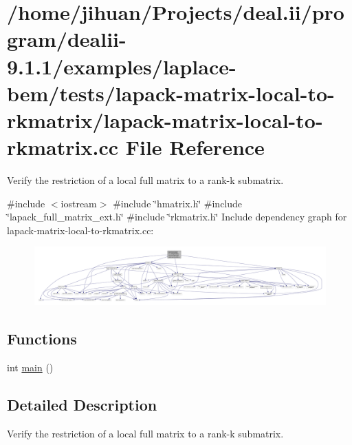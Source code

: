 \hypertarget{lapack-matrix-local-to-rkmatrix_8cc}{}\section{/home/jihuan/\+Projects/deal.ii/program/dealii-\/9.1.1/examples/laplace-\/bem/tests/lapack-\/matrix-\/local-\/to-\/rkmatrix/lapack-\/matrix-\/local-\/to-\/rkmatrix.cc File Reference}
\label{lapack-matrix-local-to-rkmatrix_8cc}


Verify the restriction of a local full matrix to a rank-\/k submatrix.  


{\ttfamily \#include $<$iostream$>$}\newline
{\ttfamily \#include \char`\"{}hmatrix.\+h\char`\"{}}\newline
{\ttfamily \#include \char`\"{}lapack\+\_\+full\+\_\+matrix\+\_\+ext.\+h\char`\"{}}\newline
{\ttfamily \#include \char`\"{}rkmatrix.\+h\char`\"{}}\newline
Include dependency graph for lapack-\/matrix-\/local-\/to-\/rkmatrix.cc\+:
\nopagebreak
\begin{figure}[H]
\begin{center}
\leavevmode
\includegraphics[width=350pt]{lapack-matrix-local-to-rkmatrix_8cc__incl}
\end{center}
\end{figure}
\subsection*{Functions}
\begin{DoxyCompactItemize}
\item 
int \hyperlink{lapack-matrix-local-to-rkmatrix_8cc_ae66f6b31b5ad750f1fe042a706a4e3d4}{main} ()
\end{DoxyCompactItemize}


\subsection{Detailed Description}
Verify the restriction of a local full matrix to a rank-\/k submatrix. 

